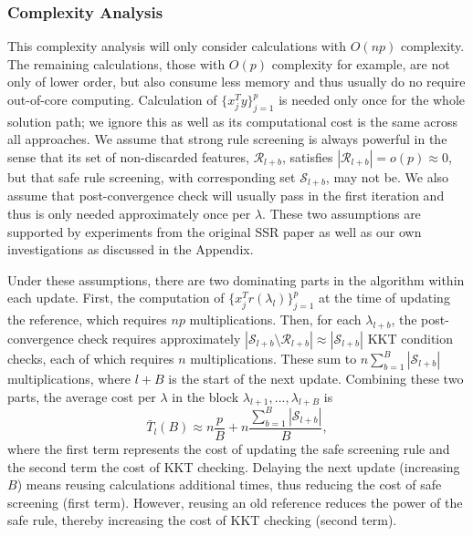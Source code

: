 \subsubsection{Complexity Analysis}
\label{sec:complexity}

This complexity analysis will only consider calculations with $O(np)$ complexity. The remaining calculations, those with $O(p)$ complexity for example, are not only of lower order, but also consume less memory and thus usually do no require out-of-core computing. Calculation of $\{x_j^Ty\}_{j=1}^p$ is needed only once for the whole solution path; we ignore this as well as its computational cost is the same across all approaches. We assume that strong rule screening is always powerful in the sense that its set of non-discarded features, $\mathcal{R}_{l+b}$, satisfies $|\mathcal{R}_{l+b}|=o(p) \approx 0$, but that safe rule screening, with corresponding set $\mathcal{S}_{l+b}$, may not be. We also assume that post-convergence check will usually pass in the first iteration and thus is only needed approximately once per $\lambda$. These two assumptions are supported by experiments from the original SSR paper \citep{Tibshirani2012} as well as our own investigations as discussed in the Appendix.

Under these assumptions, there are two dominating parts in the algorithm within each update. First, the computation of $\{x_j^Tr(\lambda_l)\}_{j=1}^p$ at the time of updating the reference, which requires $np$ multiplications. Then, for each $\lambda_{l+b}$, the post-convergence check requires approximately $|\mathcal{S}_{l+b} \setminus \mathcal{R}_{l+b}| \approx |\mathcal{S}_{l+b}|$ KKT condition checks, each of which requires $n$ multiplications. These sum to $n\sum_{b=1}^{B}|\mathcal{S}_{l+b}|$ multiplications, where $l+B$ is the start of the next update. Combining these two parts, the average cost per $\lambda$ in the block $\lambda_{l+1},...,\lambda_{l+B}$ is
\begin{equation}
    \label{eq:cost}
    \bar{T}_l(B) \approx n\frac{p}{B}+n\frac{\sum_{b=1}^B|\mathcal{S}_{l+b}|}{B},
\end{equation}
where the first term represents the cost of updating the safe screening rule and the second term the cost of KKT checking. Delaying the next update (increasing $B$) means reusing calculations additional times, thus reducing the cost of safe screening (first term). However, reusing an old reference reduces the power of the safe rule, thereby increasing the cost of KKT checking (second term).

